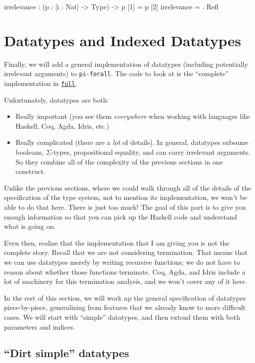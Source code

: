 \documentclass{article}
\newcommand\pif{\texttt{pi-forall}\xspace}
\theoremstyle{definition}
\begin{document}
\begin{piforall}
irrelevance : (p : [i : Nat] -> Type) -> p [1] = p [2]
irrelevance = \p . Refl
\end{piforall}

\section{Datatypes and Indexed Datatypes}
\label{sec:datatypes}

Finally, we will add a general implementation of datatypes (including
potentially irrelevant arguments) to \pif.  The code to look at is the
``complete'' implementation in \href{full/}{\texttt{full}}.

Unfortunately, datatypes are both:

\begin{itemize}
\item
  Really important (you see them \emph{everywhere} when working with
  languages like Haskell, Coq, Agda, Idris, etc.)
\item
  Really complicated (there are a \emph{lot} of details). In general, datatypes
  subsume booleans, $\Sigma$-types, propositional equality, and can carry
  irrelevant arguments. So they combine all of the complexity of the previous
  sections in one construct.
\end{itemize}

Unlike the previous sections, where we could walk through all of the details
of the specification of the type system, not to mention its implementation, we
won't be able to do that here. There is just too much! The goal of this part
is to give you enough information so that you can pick up the Haskell code and
understand what is going on.

Even then, realize that the implementation that I am giving you is not the
complete story. Recall that we are not considering termination. That means that
we can use datatypes merely by writing recursive functions; we do not have to
reason about whether those functions terminate. Coq, Agda, and Idris include a
lot of machinery for this termination analysis, and we won't cover any of it
here.

In the rest of this section, we will work up the general specification of
datatypes piece-by-piece, generalizing from features that we already know to
more difficult cases.  We will start with ``simple'' datatypes, and then extend
them with both parameters and indices.

\subsection{``Dirt simple'' datatypes}\label{dirt-simple-datatypes}
\end{document}
